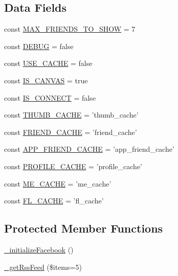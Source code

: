 \subsection*{Data Fields}
\begin{DoxyCompactItemize}
\item 
const \hyperlink{classCPSFacebookAppController_a92f90cffdcf9bdc7042c27210d7bf711}{MAX\_\-FRIENDS\_\-TO\_\-SHOW} = 7
\item 
const \hyperlink{classCPSFacebookAppController_a758c150b67e476ecf77478f16b387c61}{DEBUG} = false
\item 
const \hyperlink{classCPSFacebookAppController_aa59dac68626789b109ad0c18e6fbb96e}{USE\_\-CACHE} = false
\item 
const \hyperlink{classCPSFacebookAppController_a70840ece73140159e9b08da06002ae3a}{IS\_\-CANVAS} = true
\item 
const \hyperlink{classCPSFacebookAppController_ac3a66a3e0e2e675b4aa12dec472b8dd0}{IS\_\-CONNECT} = false
\item 
const \hyperlink{classCPSFacebookAppController_a68a34ece4de56a54f4f82c474c0204d7}{THUMB\_\-CACHE} = 'thumb\_\-cache'
\item 
const \hyperlink{classCPSFacebookAppController_a33ac1db1c172ba0f5722c97f00af34d6}{FRIEND\_\-CACHE} = 'friend\_\-cache'
\item 
const \hyperlink{classCPSFacebookAppController_a1893848deeea686e915dd2151301e807}{APP\_\-FRIEND\_\-CACHE} = 'app\_\-friend\_\-cache'
\item 
const \hyperlink{classCPSFacebookAppController_a566d4822d1e8b1e6a916007a2be84878}{PROFILE\_\-CACHE} = 'profile\_\-cache'
\item 
const \hyperlink{classCPSFacebookAppController_a3fefc47757aedf92a1e71a894503a9e0}{ME\_\-CACHE} = 'me\_\-cache'
\item 
const \hyperlink{classCPSFacebookAppController_a52c5815c1a32c4d4e554abd7c6071f56}{FL\_\-CACHE} = 'fl\_\-cache'
\end{DoxyCompactItemize}
\subsection*{Protected Member Functions}
\begin{DoxyCompactItemize}
\item 
\hyperlink{classCPSFacebookAppController_ac7d88d5e0b0fb564c0e1ae69167e8449}{\_\-initializeFacebook} ()
\item 
\hyperlink{classCPSFacebookAppController_aef66ca6a78a6289bce2ba881bf575b12}{\_\-getRssFeed} (\$items=5)
\end{DoxyCompactItemize}
